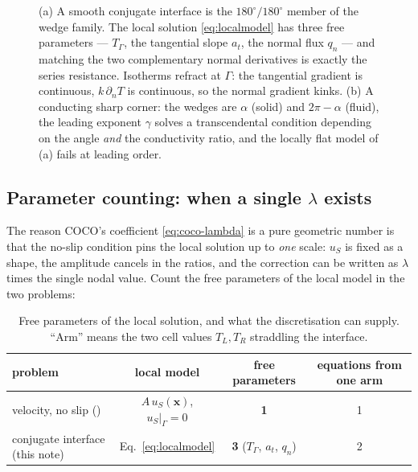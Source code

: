 \documentclass[11pt,a4paper]{article}
\begin{document}
\begin{figure}[htbp]
\caption{(a) A smooth conjugate interface is the $180^\circ/180^\circ$ member of
the wedge family. The local solution \eqref{eq:localmodel} has three free
parameters --- $T_\Gamma$, the tangential slope $a_t$, the normal flux $q_n$ ---
and matching the two complementary normal derivatives is exactly the series
resistance. Isotherms refract at $\Gamma$: the tangential gradient is
continuous, $k\,\partial_nT$ is continuous, so the normal gradient kinks.
(b) A conducting sharp corner: the wedges are $\alpha$ (solid) and
$2\pi-\alpha$ (fluid), the leading exponent $\gamma$ solves a transcendental
condition depending on the angle \emph{and} the conductivity ratio, and the
locally flat model of (a) fails at leading order.}
\label{fig:wedges}
\end{figure}

\subsection{Parameter counting: when a single $\lambda$ exists}
\label{sec:counting}

The reason COCO's coefficient \eqref{eq:coco-lambda} is a pure geometric number
is that the no-slip condition pins the local solution up to \emph{one} scale:
$u_S$ is fixed as a shape, the amplitude cancels in the ratios, and the
correction can be written as $\lambda$ times the single nodal value. Count the
free parameters of the local model in the two problems:

\begin{table}[htbp]
\centering
\caption{Free parameters of the local solution, and what the discretisation can
supply. ``Arm'' means the two cell values $T_L,T_R$ straddling the interface.}
\label{tab:counting}
\begin{tabular}{@{}lccc@{}}
\toprule
problem & local model & free parameters & equations from one arm \\
\midrule
velocity, no slip (\cite{luchini2025,cipelli2025})
  & $A\,u_S(\boldsymbol{x})$, $u_S|_\Gamma=0$
  & \textbf{1} & 1 \\
conjugate interface (this note)
  & Eq.~\eqref{eq:localmodel}
  & \textbf{3} ($T_\Gamma$, $a_t$, $q_n$) & 2 \\
\bottomrule
\end{tabular}
\end{table}
\end{document}
